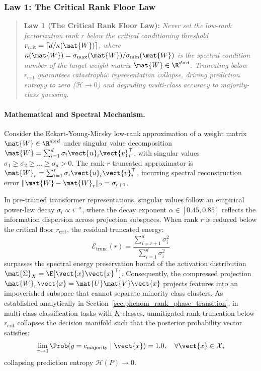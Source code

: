 \subsubsection{Law 1: The Critical Rank Floor Law}
\label{sec:law1_rank_floor}

\begin{quote}
\textbf{Law 1 (The Critical Rank Floor Law):} \emph{Never set the low-rank factorization rank $r$ below the critical conditioning threshold $r_{\text{crit}} = \lceil d / \kappa(\mat{W}) \rceil$, where $\kappa(\mat{W}) = \sigma_{\max}(\mat{W}) / \sigma_{\min}(\mat{W})$ is the spectral condition number of the target weight matrix $\mat{W} \in \R^{d \times d}$. Truncating below $r_{\text{crit}}$ guarantees catastrophic representation collapse, driving prediction entropy to zero ($\mathcal{H} \to 0$) and degrading multi-class accuracy to majority-class guessing.}
\end{quote}

\paragraph{Mathematical and Spectral Mechanism.}
Consider the Eckart-Young-Mirsky low-rank approximation of a weight matrix $\mat{W} \in \R^{d \times d}$ under singular value decomposition $\mat{W} = \sum_{i=1}^d \sigma_i \vect{u}_i \vect{v}_i^\top$, with singular values $\sigma_1 \ge \sigma_2 \ge \dots \ge \sigma_d > 0$. The rank-$r$ truncated approximator is $\mat{W}_r = \sum_{i=1}^r \sigma_i \vect{u}_i \vect{v}_i^\top$, incurring spectral reconstruction error $\|\mat{W} - \mat{W}_r\|_2 = \sigma_{r+1}$.

In pre-trained transformer representations, singular values follow an empirical power-law decay $\sigma_i \propto i^{-\alpha}$, where the decay exponent $\alpha \in [0.45, 0.85]$ reflects the information dispersion across projection subspaces. When rank $r$ is reduced below the critical floor $r_{\text{crit}}$, the residual truncated energy:
\begin{equation}
\mathcal{E}_{\text{trunc}}(r) = \frac{\sum_{i=r+1}^d \sigma_i^2}{\sum_{i=1}^d \sigma_i^2}
\end{equation}
surpasses the spectral energy preservation bound of the activation distribution $\mat{\Sigma}_X = \E[\vect{x}\vect{x}^\top]$. Consequently, the compressed projection $\mat{W}_r \vect{x} = \mat{U} \mat{V} \vect{x}$ projects features into an impoverished subspace that cannot separate minority class clusters. As established analytically in Section~\ref{sec:phenom_rank_phase_transition}, in multi-class classification tasks with $K$ classes, unmitigated rank truncation below $r_{\text{crit}}$ collapses the decision manifold such that the posterior probability vector satisfies:
\begin{equation}
\lim_{r \to 0} \Prob(y = c_{\text{majority}} \mid \vect{x}) = 1.0, \quad \forall \vect{x} \in \mathcal{X},
\end{equation}
collapsing prediction entropy $\mathcal{H}(P) \to 0$.

